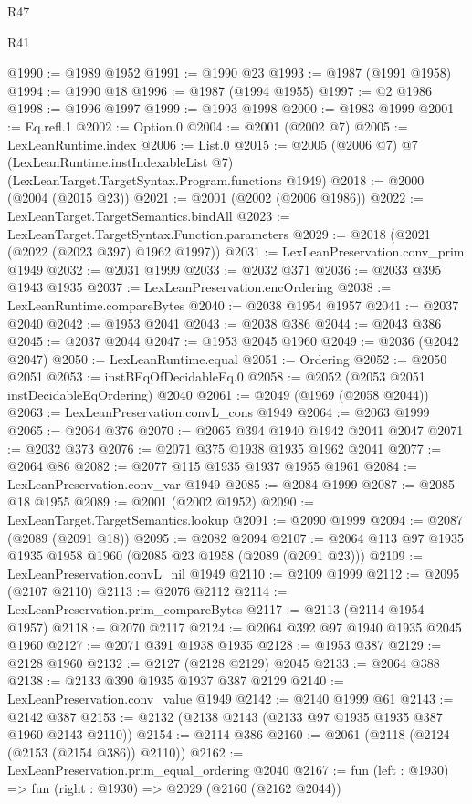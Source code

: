 \begin{lexlean}{R47}
\begin{lexlean}{R41}
\begin{coremodule}
{{{{{{{{{{{{{{{{{{{{{{{{{{{{{{{{{{{{{{{{{{{{{{{{{{{{{{{{{{{{{{{{{{{{{{{{{{{{{{{{{{{{{{{@1990 := @1989 @1952
@1991 := @1990 @23
@1993 := @1987 (@1991 @1958)
@1994 := @1990 @18
@1996 := @1987 (@1994 @1955)
@1997 := @2 @1986
@1998 := @1996 @1997
@1999 := @1993 @1998
@2000 := @1983 @1999
@2001 := Eq.refl.{1}
@2002 := Option.{0}
@2004 := @2001 (@2002 @7)
@2005 := LexLeanRuntime.index
@2006 := List.{0}
@2015 := @2005
    (@2006 @7)
    @7
    (LexLeanRuntime.instIndexableList @7)
    (LexLeanTarget.TargetSyntax.Program.functions @1949)
@2018 := @2000 (@2004 (@2015 @23))
@2021 := @2001 (@2002 (@2006 @1986))
@2022 := LexLeanTarget.TargetSemantics.bindAll
@2023 := LexLeanTarget.TargetSyntax.Function.parameters
@2029 := @2018 (@2021 (@2022 (@2023 @397) @1962 @1997))
@2031 := LexLeanPreservation.conv_prim @1949
@2032 := @2031 @1999
@2033 := @2032 @371
@2036 := @2033 @395 @1943 @1935
@2037 := LexLeanPreservation.encOrdering
@2038 := LexLeanRuntime.compareBytes
@2040 := @2038 @1954 @1957
@2041 := @2037 @2040
@2042 := @1953 @2041
@2043 := @2038 @386
@2044 := @2043 @386
@2045 := @2037 @2044
@2047 := @1953 @2045 @1960
@2049 := @2036 (@2042 @2047)
@2050 := LexLeanRuntime.equal
@2051 := Ordering
@2052 := @2050 @2051
@2053 := instBEqOfDecidableEq.{0}
@2058 := @2052 (@2053 @2051 instDecidableEqOrdering) @2040
@2061 := @2049 (@1969 (@2058 @2044))
@2063 := LexLeanPreservation.convL_cons @1949
@2064 := @2063 @1999
@2065 := @2064 @376
@2070 := @2065 @394 @1940 @1942 @2041 @2047
@2071 := @2032 @373
@2076 := @2071 @375 @1938 @1935 @1962 @2041
@2077 := @2064 @86
@2082 := @2077 @115 @1935 @1937 @1955 @1961
@2084 := LexLeanPreservation.conv_var @1949
@2085 := @2084 @1999
@2087 := @2085 @18 @1955
@2089 := @2001 (@2002 @1952)
@2090 := LexLeanTarget.TargetSemantics.lookup
@2091 := @2090 @1999
@2094 := @2087 (@2089 (@2091 @18))
@2095 := @2082 @2094
@2107 := @2064 @113 @97 @1935 @1935 @1958 @1960 (@2085 @23 @1958 (@2089 (@2091 @23)))
@2109 := LexLeanPreservation.convL_nil @1949
@2110 := @2109 @1999
@2112 := @2095 (@2107 @2110)
@2113 := @2076 @2112
@2114 := LexLeanPreservation.prim_compareBytes
@2117 := @2113 (@2114 @1954 @1957)
@2118 := @2070 @2117
@2124 := @2064 @392 @97 @1940 @1935 @2045 @1960
@2127 := @2071 @391 @1938 @1935
@2128 := @1953 @387
@2129 := @2128 @1960
@2132 := @2127 (@2128 @2129) @2045
@2133 := @2064 @388
@2138 := @2133 @390 @1935 @1937 @387 @2129
@2140 := LexLeanPreservation.conv_value @1949
@2142 := @2140 @1999 @61
@2143 := @2142 @387
@2153 := @2132 (@2138 @2143 (@2133 @97 @1935 @1935 @387 @1960 @2143 @2110))
@2154 := @2114 @386
@2160 := @2061 (@2118 (@2124 (@2153 (@2154 @386)) @2110))
@2162 := LexLeanPreservation.prim_equal_ordering @2040
@2167 := fun (left : @1930) => fun (right : @1930) => @2029 (@2160 (@2162 @2044))
}}}}}}}}}}}}}}}}}}}}}}}}}}}}}}}}}}}}}}}}}}}}}}}}}}}}}}}}}}}}}}}}}}}}}}}}}}}}}}}}}}}}}}}
\end{coremodule}
\end{lexlean}
\end{lexlean}
